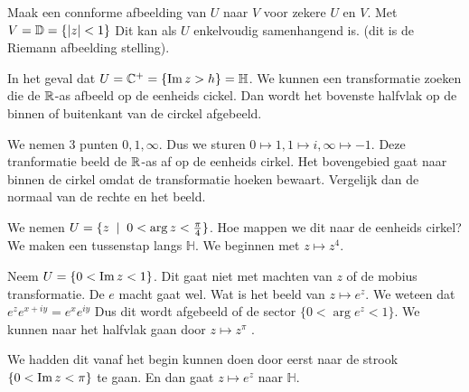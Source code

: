 	Maak een connforme afbeelding van $U$ naar $V$ voor zekere $U$ en $V$. 
	Met $V = \mathbb D = \{\left| z \right| < 1\} $ 
	Dit kan als $U$ enkelvoudig samenhangend is.  (dit is de Riemann afbeelding stelling). 
\begin{vb}

	In het geval dat  $U = \mathbb{C}^{+} = \{\operatorname{Im} z > h\} = \mathbb H$. 
	We kunnen een transformatie zoeken die de $\mathbb{R}$-as afbeeld op de eenheids cickel. Dan wordt het bovenste halfvlak op de binnen of buitenkant van de circkel afgebeeld. 

	We nemen 3 punten $0, 1, \infty$. Dus we sturen $0 \mapsto  1, 1\mapsto i, \infty \mapsto  -1$. Deze tranformatie beeld de $\mathbb{R}$-as af op de eenheids cirkel. 
	Het bovengebied gaat naar binnen de cirkel omdat de transformatie hoeken bewaart. 
	Vergelijk dan de normaal van de rechte en het beeld. 
\end{vb}
\begin{vb}
We nemen $U = \{z \st 0 < \arg z < \frac{\pi}{4}\} $. Hoe mappen we dit naar de eenheids cirkel?
We maken een tussenstap langs $\mathbb H$. We beginnen met  $z\mapsto z^{4}$.
\end{vb}
\begin{vb}
	Neem $U = \{0 < \operatorname{Im}  z < 1\} $. Dit gaat niet met machten van  $z$ of de mobius transformatie. 
	De $e$ macht gaat wel. Wat is het beeld van $z\mapsto  e^{z}$. 
We weteen dat $e^{z} e ^{x + iy} = e^{x} e ^{iy}$
Dus dit wordt afgebeeld of de sector  $ \{0 < \arg e ^{z} < 1 \} $. 
We kunnen naar het halfvlak gaan door $z\mapsto  z^{\pi}$ .

We hadden dit vanaf het begin kunnen doen door eerst naar de strook $\{ 0 < \operatorname{Im} z < \pi \} $ te gaan. En dan gaat $z\mapsto e^{z}$ naar $\mathbb{H}$.
\end{vb}
